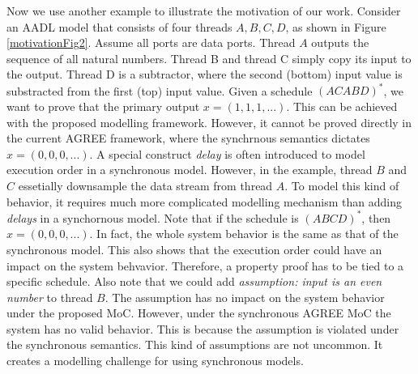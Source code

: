 Now we use another example to illustrate the motivation of our work.
Consider an AADL model that consists of four threads $A, B, C, D$, as shown in Figure \ref{motivationFig2}. Assume all ports are data ports. Thread $A$ outputs the sequence of all natural numbers. Thread B and thread C simply copy its input to the output. Thread D is a subtractor, where the second (bottom) input value is substracted from the first (top) input value. Given a schedule $(ACABD)^*$, we want to prove that the primary output $x = (1,1,1,...)$. This can be achieved with the proposed modelling framework. However, it cannot be proved directly in the current AGREE framework, where the synchrnous semantics dictates $x= (0,0,0,...)$. A special construct \emph{delay} is often introduced to model execution order in a synchronous model. However, in the example, thread $B$ and $C$ essetially downsample the data stream from thread $A$. To model this kind of behavior, it requires much more complicated modelling mechanism than adding \emph{delays} in a synchornous model. 
Note that if the schedule is $(ABCD)^*$, then $x=(0,0,0,...)$. In fact, the whole system behavior is the same as that of the synchronous model. This also shows that the execution order could have an impact on the system behvavior. Therefore, a property proof has to be tied to a specific schedule.
Also note that we could add \emph{assumption: input is an even number} to thread $B$. The assumption has no impact on the system behavior under the proposed MoC. However, under the synchronous AGREE MoC the system has no valid behavior. This is because the assumption is violated under the synchronous semantics. This kind of assumptions are not uncommon. It creates a modelling challenge for using synchronous models. 

